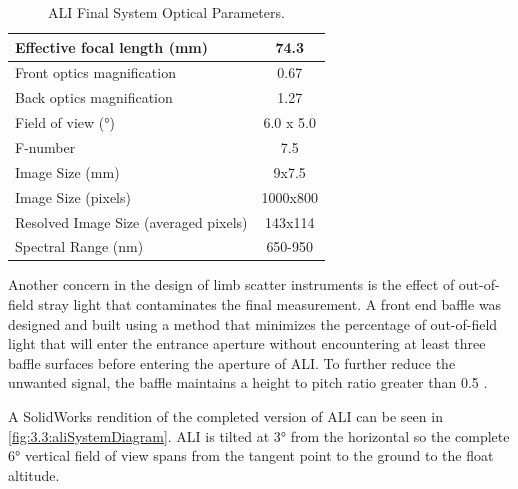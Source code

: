 \documentclass[12pt]{article}
\begin{document}
\begin{table}[!ht]
    \begin{center}
    \begin{tabular}{|l|c|}
      \hline
      Effective focal length (mm) & 74.3 \\
      \hline
      Front optics magnification & 0.67 \\
      \hline
      Back optics magnification & 1.27 \\
      \hline
      Field of view (\si{\degree}) & 6.0 x 5.0 \\
      \hline
      F-number & 7.5 \\
      \hline
      Image Size (mm) & 9x7.5\\
      \hline
      Image Size (pixels) & 1000x800\\
      \hline
      Resolved Image Size (averaged pixels) & 143x114\\
      \hline
      Spectral Range (nm) & 650-950\\
      \hline
    \end{tabular}
    \end{center}
    \caption{ALI Final System Optical Parameters.}
    \label{tab:3.2:ALISystemParameters}
\end{table}

Another concern in the design of limb scatter instruments is the effect of out-of-field stray light that contaminates the final measurement. A front end baffle was designed and built using a method that minimizes the percentage of out-of-field light that will enter the entrance aperture without encountering at least three baffle surfaces before entering the aperture of ALI. To further reduce the unwanted signal, the baffle maintains a height to pitch ratio greater than 0.5 \citep{Fischer2008}.

A SolidWorks rendition of the completed version of ALI can be seen in \autoref{fig:3.3:aliSystemDiagram}. ALI is tilted at 3\si{\degree} from the horizontal so the complete 6\si{\degree} vertical field of view spans from the tangent point to the ground to the float altitude. %
\end{document}
